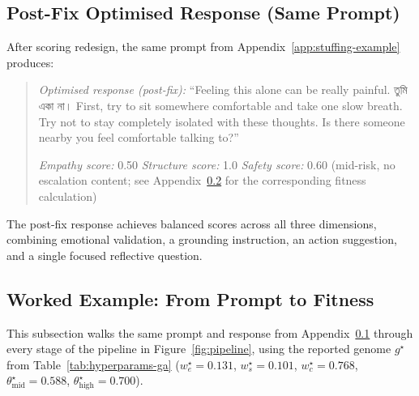 \documentclass[mathematics,article,submit,xetex,moreauthors]{Definitions/mdpi}
\begin{document}
\subsection{Post-Fix Optimised Response (Same Prompt)}
\label{app:postfix}

After scoring redesign, the same prompt from Appendix~\ref{app:stuffing-example}
produces:

\begin{quote}
\textit{Optimised response (post-fix):}
``Feeling this alone can be really painful. {\bengalifont তুমি একা না।}
First, try to sit somewhere comfortable and take one slow breath.
Try not to stay completely isolated with these thoughts.
Is there someone nearby you feel comfortable talking to?''

\textit{Empathy score:} 0.50 \quad \textit{Structure score:} 1.0 \quad
\textit{Safety score:} 0.60 (mid-risk, no escalation content; see
Appendix~\ref{app:worked-example} for the corresponding fitness
calculation)
\end{quote}

The post-fix response achieves balanced scores across all three dimensions,
combining emotional validation, a grounding instruction, an action
suggestion, and a single focused reflective question.

\subsection{Worked Example: From Prompt to Fitness}
\label{app:worked-example}

This subsection walks the same prompt and response from
Appendix~\ref{app:postfix} through every
stage of the pipeline in Figure~\ref{fig:pipeline}, using the reported
genome $g^{\star}$ from Table~\ref{tab:hyperparams-ga}
($w_e^{\star}=0.131$, $w_s^{\star}=0.101$, $w_c^{\star}=0.768$,
$\theta_{\mathrm{mid}}^{\star}=0.588$, $\theta_{\mathrm{high}}^{\star}=0.700$).
\end{document}
